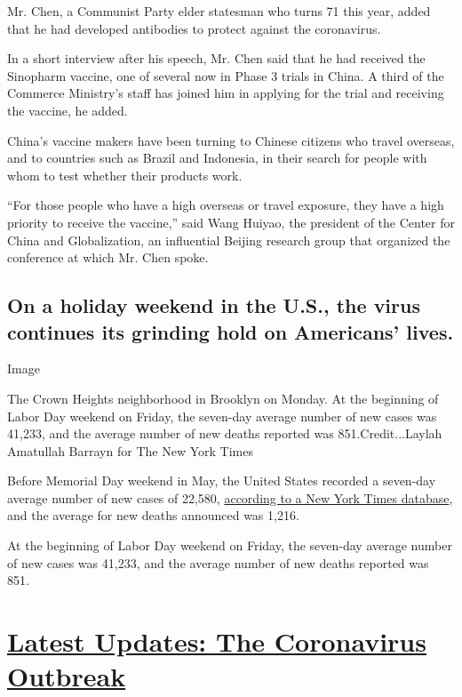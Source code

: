 Mr. Chen, a Communist Party elder statesman who turns 71 this year,
added that he had developed antibodies to protect against the
coronavirus.

In a short interview after his speech, Mr. Chen said that he had
received the Sinopharm vaccine, one of several now in Phase 3 trials in
China. A third of the Commerce Ministry's staff has joined him in
applying for the trial and receiving the vaccine, he added.

China's vaccine makers have been turning to Chinese citizens who travel
overseas, and to countries such as Brazil and Indonesia, in their search
for people with whom to test whether their products work.

``For those people who have a high overseas or travel exposure, they
have a high priority to receive the vaccine,'' said Wang Huiyao, the
president of the Center for China and Globalization, an influential
Beijing research group that organized the conference at which Mr. Chen
spoke.

\hypertarget{on-a-holiday-weekend-in-the-us-the-virus-continues-its-grinding-hold-on-americans-lives}{%
\subsection{On a holiday weekend in the U.S., the virus continues its
grinding hold on Americans'
lives.}\label{on-a-holiday-weekend-in-the-us-the-virus-continues-its-grinding-hold-on-americans-lives}}

Image

The Crown Heights neighborhood in Brooklyn on Monday. At the beginning
of Labor Day weekend on Friday, the seven-day average number of new
cases was 41,233, and the average number of new deaths reported was
851.Credit...Laylah Amatullah Barrayn for The New York Times

Before Memorial Day weekend in May, the United States recorded a
seven-day average number of new cases of 22,580,
\href{https://www.nytimes3xbfgragh.onion/interactive/2020/us/coronavirus-us-cases.html}{according
to a New York Times database}, and the average for new deaths announced
was 1,216.

At the beginning of Labor Day weekend on Friday, the seven-day average
number of new cases was 41,233, and the average number of new deaths
reported was 851.

\hypertarget{latest-updates-the-coronavirus-outbreak}{%
\section{\texorpdfstring{\href{https://www.nytimes3xbfgragh.onion/2020/09/08/world/covid-19-coronavirus.html?action=click\&pgtype=Article\&state=default\&region=MAIN_CONTENT_1\&context=storylines_live_updates}{Latest
Updates: The Coronavirus
Outbreak}}{Latest Updates: The Coronavirus Outbreak}}\label{latest-updates-the-coronavirus-outbreak}}

